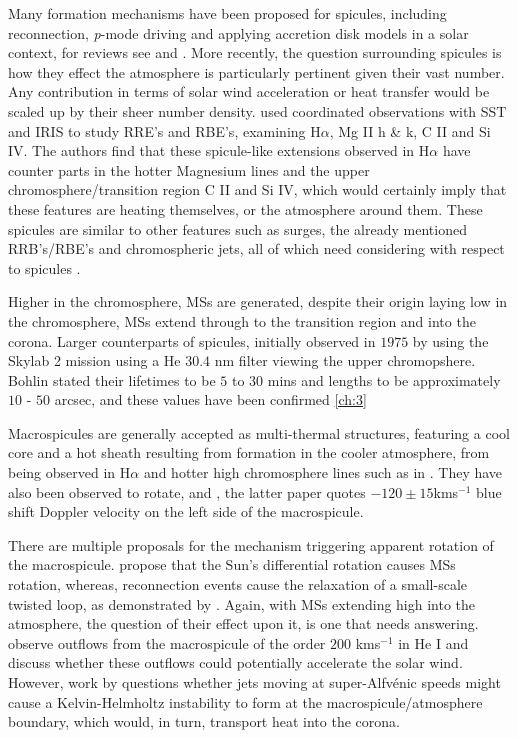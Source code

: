 Many formation mechanisms have been proposed for spicules, including reconnection, \emph{p}-mode driving and applying accretion disk models in a solar context, for reviews see \cite{Sterling2000} and \cite{Zaqara_Erdelyi2009}.
More recently, the question surrounding spicules is how they effect the atmosphere is particularly pertinent given their vast number. 
Any contribution in terms of solar wind acceleration or heat transfer would be scaled up by their sheer number density.
\cite{Rouppe2015} used coordinated observations with SST and IRIS to study RRE's and RBE's, examining H$\alpha$, Mg II h \& k, C II and Si IV.
The authors find that these spicule-like extensions observed in H$\alpha$ have counter parts in the hotter Magnesium lines and the upper chromosphere/transition region C II and Si IV, which would certainly imply that these features are heating themselves, or the atmosphere around them.
These spicules are similar to other features such as surges, the already mentioned RRB's/RBE's and chromospheric jets, all of which need considering with respect to spicules \cite{Tsiropoula2012, Kuridze2015}.


Higher in the chromosphere, MSs are generated, despite their origin laying low in the chromosphere, MSs extend through to the transition region and into the corona. 
Larger counterparts of spicules, initially observed in $1975$ by \cite{Bohlin1975} using the Skylab 2 mission using a He $30.4$ nm filter viewing the upper chromopshere.
Bohlin stated their lifetimes to be $5$ to $30$ mins and lengths to be approximately $10$ - $50$ arcsec, and these values have been confirmed \cref{ch:3}

Macrospicules are generally accepted as multi-thermal structures, featuring a cool core and a hot sheath resulting from formation in the cooler atmosphere, from being observed in H$\alpha$ \citep{LaBonte79} and hotter high chromosphere lines such as in \cite{Parenti2002}.
They have also been observed to rotate, \cite{Pike_Mason1998} and \cite{Kamio2010}, the latter paper quotes $-120 \pm 15$kms$^{-1}$ blue shift Doppler velocity on the left side of the macrospicule. 

There are multiple proposals for the mechanism triggering apparent rotation of the macrospicule. 
\cite{Curdt2011} propose that the Sun's differential rotation causes MSs rotation, whereas, reconnection events cause the relaxation of a small-scale twisted loop, as demonstrated by \cite{Adams2014}.
Again, with MSs extending high into the atmosphere, the question of their effect upon it, is one that needs answering.
\cite{Pike1997} observe outflows from the macrospicule of the order $200$ kms$^{-1}$ in He I and discuss whether these outflows could potentially accelerate the solar wind.
However, work by \cite{Zaqarashvili2014} questions whether jets moving at super-Alfv{\'e}nic speeds might cause a Kelvin-Helmholtz instability to form at the macrospicule/atmosphere boundary, which would, in turn, transport heat into the corona.

